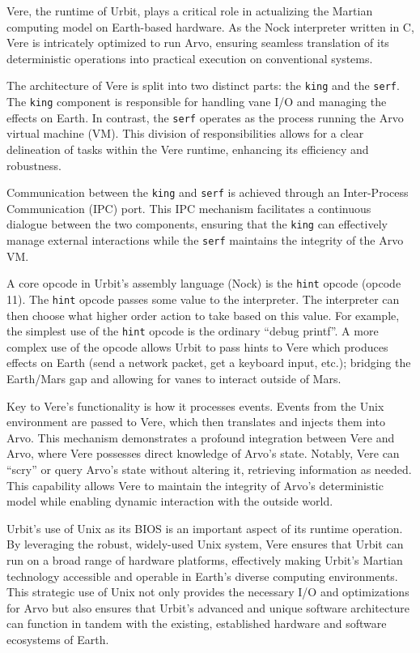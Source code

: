 \documentclass[twoside]{article}
\begin{document}
Vere, the runtime of Urbit, plays a critical role in actualizing the Martian computing model on Earth-based hardware.
As the Nock interpreter written in C, Vere is intricately optimized to run Arvo, ensuring seamless translation of its deterministic operations into practical execution on conventional systems.

The architecture of Vere is split into two distinct parts: the \texttt{king} and the \texttt{serf}.
The \texttt{king} component is responsible for handling vane I/O and managing the effects on Earth.
In contrast, the \texttt{serf} operates as the process running the Arvo virtual machine (VM).
This division of responsibilities allows for a clear delineation of tasks within the Vere runtime, enhancing its efficiency and robustness.

Communication between the \texttt{king} and \texttt{serf} is achieved through an Inter-Process Communication (IPC) port. 
This IPC mechanism facilitates a continuous dialogue between the two components, ensuring that the \texttt{king} can effectively manage external interactions while the \texttt{serf} maintains the integrity of the Arvo VM.

A core opcode in Urbit's assembly language (Nock) is the \texttt{hint} opcode (opcode 11). 
The \texttt{hint} opcode passes some value to the interpreter. 
The interpreter can then choose what higher order action to take based on this value.
For example, the simplest use of the \texttt{hint} opcode is the ordinary ``debug printf''.
A more complex use of the opcode allows Urbit to pass hints to Vere which produces effects on Earth (send a network packet, get a keyboard input, etc.); bridging the Earth/Mars gap and allowing for vanes to interact outside of Mars.

Key to Vere's functionality is how it processes events. 
Events from the Unix environment are passed to Vere, which then translates and injects them into Arvo.
This mechanism demonstrates a profound integration between Vere and Arvo, where Vere possesses direct knowledge of Arvo's state. 
Notably, Vere can ``scry'' or query Arvo's state without altering it, retrieving information as needed. 
This capability allows Vere to maintain the integrity of Arvo's deterministic model while enabling dynamic interaction with the outside world.

Urbit's use of Unix as its BIOS is an important aspect of its runtime operation. 
By leveraging the robust, widely-used Unix system, Vere ensures that Urbit can run on a broad range of hardware platforms, effectively making Urbit's Martian technology accessible and operable in Earth's diverse computing environments. 
This strategic use of Unix not only provides the necessary I/O and optimizations for Arvo but also ensures that Urbit's advanced and unique software architecture can function in tandem with the existing, established hardware and software ecosystems of Earth.
\end{document}
